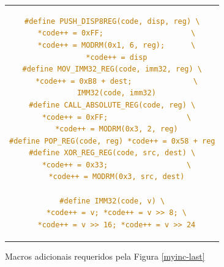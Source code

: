 
\begin{figure}[ht!]
  \centering
  \begin{tabular}{c}
    \begin{lstlisting}[language=C]
#define PUSH_DISP8REG(code, disp, reg) \
  *code++ = 0xFF;                    \
  *code++ = MODRM(0x1, 6, reg);      \
  *code++ = disp
#define MOV_IMM32_REG(code, imm32, reg) \
  *code++ = 0xB8 + dest;              \
  IMM32(code, imm32)
#define CALL_ABSOLUTE_REG(code, reg) \
  *code++ = 0xFF;                  \
  *code++ = MODRM(0x3, 2, reg)
#define POP_REG(code, reg) *code++ = 0x58 + reg
#define XOR_REG_REG(code, src, dest) \
  *code++ = 0x33;                  \
  *code++ = MODRM(0x3, src, dest)

#define IMM32(code, v) \
  *code++ = v; *code++ = v >> 8; \
  *code++ = v >> 16; *code++ = v >> 24
    \end{lstlisting}
  \end{tabular}
  \caption{Macros adicionais requeridos pela Figura \ref{myinc-last}\label{myinc-last-macros}}
\end{figure}

